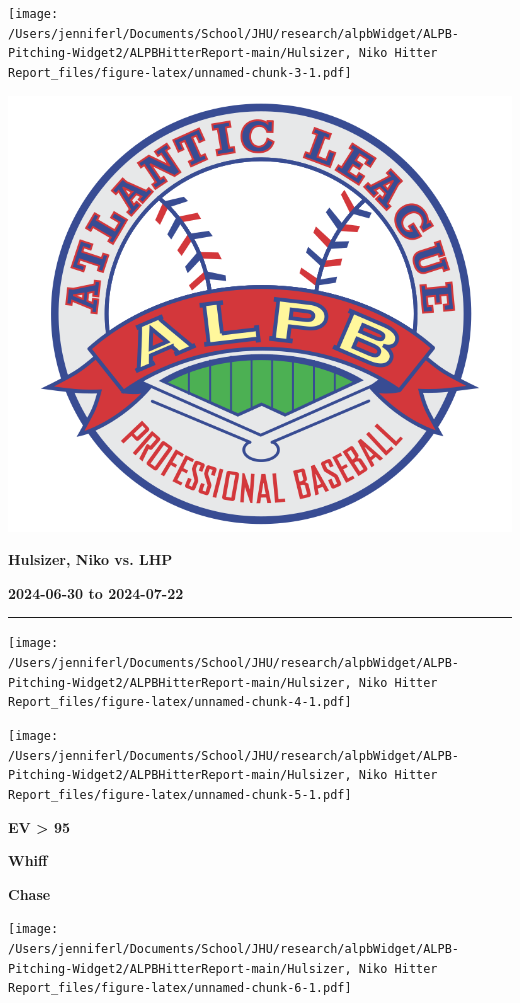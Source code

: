 \documentclass[
]{article}
\begin{document}
\texttt{[image: /Users/jenniferl/Documents/School/JHU/research/alpbWidget/ALPB-Pitching-Widget2/ALPBHitterReport-main/Hulsizer, Niko Hitter Report\_files/figure-latex/unnamed-chunk-3-1.pdf]}

\newpage
\begin{multicols}{3}

\includegraphics[width=0.4\columnwidth]{ALPB_Logo}

\hspace{0pt}
\vfill
\hspace{-0.5in}\large\textbf{Hulsizer, Niko vs. LHP}
\vfill
\hspace{0pt}

\hspace{0pt}
\vfill
\large\textbf{2024-06-30 to 2024-07-22}
\vfill
\hspace{0pt}

\end{multicols}
\vspace{-0.35in}

\noindent

\rule{\textwidth}{0.75pt}

\texttt{[image: /Users/jenniferl/Documents/School/JHU/research/alpbWidget/ALPB-Pitching-Widget2/ALPBHitterReport-main/Hulsizer, Niko Hitter Report\_files/figure-latex/unnamed-chunk-4-1.pdf]}

\texttt{[image: /Users/jenniferl/Documents/School/JHU/research/alpbWidget/ALPB-Pitching-Widget2/ALPBHitterReport-main/Hulsizer, Niko Hitter Report\_files/figure-latex/unnamed-chunk-5-1.pdf]}

\begin{multicols}{3}



\hspace{0.2in}\centerline{\LARGE\textbf{EV > 95}}



\hspace{-0.05in}\centerline{\LARGE\textbf{Whiff}}



\hspace{-0.05in}\centerline{\LARGE\textbf{Chase}}
\end{multicols}

\texttt{[image: /Users/jenniferl/Documents/School/JHU/research/alpbWidget/ALPB-Pitching-Widget2/ALPBHitterReport-main/Hulsizer, Niko Hitter Report\_files/figure-latex/unnamed-chunk-6-1.pdf]}
\end{document}
